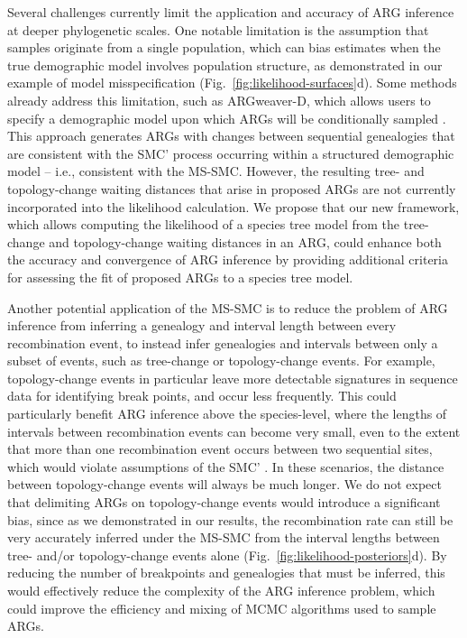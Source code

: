 \documentclass[11pt]{article}
\begin{document}
Several challenges currently limit the application and accuracy
of ARG inference at deeper phylogenetic scales. One notable limitation
is the assumption that samples originate from a single population,
which can bias estimates when the true demographic model involves 
population structure, as demonstrated in our example of model 
misspecification (Fig.~\ref{fig:likelihood-surfaces}d). 
Some methods already address this limitation, such as ARGweaver-D,
which allows users to specify a demographic model upon which ARGs 
will be conditionally sampled 
\citep{hubisz2020inference}.
% 
This approach generates ARGs with changes between sequential genealogies 
that are consistent with the SMC' process occurring within a structured
demographic model -- i.e., consistent with the MS-SMC. 
% 
However, the resulting tree- and topology-change waiting distances that 
arise in proposed ARGs are not currently incorporated into the 
likelihood calculation.
% 
We propose that our new framework, which allows computing the likelihood 
of a species tree model from the tree-change and topology-change waiting
distances in an ARG, 
could enhance both the accuracy and convergence of ARG inference by 
providing additional criteria for assessing the fit of proposed ARGs
to a species tree model.


Another potential application of the MS-SMC is to reduce the problem of 
ARG inference from inferring a genealogy and interval length between 
every recombination event, to instead infer genealogies and intervals between
only a subset of events, such as tree-change or topology-change events. 
% 
For example, topology-change events in particular leave more detectable
signatures in sequence data for identifying break points, and occur less
frequently. This could particularly benefit ARG inference above the
species-level, where the lengths of intervals between recombination events
can become very small, even to the extent that more than one 
recombination event occurs between two sequential sites, which 
would violate assumptions of the SMC' \citep{rasmussen2014genome}. 
In these scenarios, the distance between topology-change events 
will always be much longer.
% 
We do not expect that delimiting ARGs on topology-change events 
would introduce a significant bias, since as we demonstrated in 
our results, the recombination rate can still be very accurately 
inferred under the MS-SMC from the interval lengths between tree- 
and/or topology-change events alone 
(Fig.~\ref{fig:likelihood-posteriors}d). 
% 
By reducing the number of breakpoints and genealogies that must be inferred,
this would effectively reduce the complexity of the ARG inference problem, 
which could improve the efficiency and mixing of MCMC algorithms used to 
sample ARGs.
\end{document}
